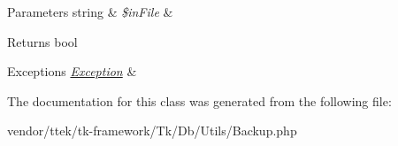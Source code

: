 \begin{DoxyParams}[1]{Parameters}
string & {\em \$in\+File} & \\
\hline
\end{DoxyParams}
\begin{DoxyReturn}{Returns}
bool 
\end{DoxyReturn}

\begin{DoxyExceptions}{Exceptions}
{\em \hyperlink{classTk_1_1Db_1_1Exception}{Exception}} & \\
\hline
\end{DoxyExceptions}


The documentation for this class was generated from the following file\+:\begin{DoxyCompactItemize}
\item 
vendor/ttek/tk-\/framework/\+Tk/\+Db/\+Utils/Backup.\+php\end{DoxyCompactItemize}
